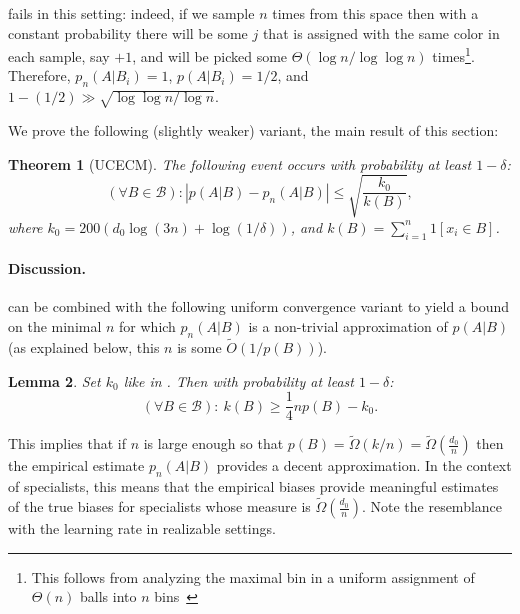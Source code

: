 \documentclass{article}
\def\B{{\mathcal B}}
\newtheorem{theorem}{Theorem}
\newtheorem{lemma}[theorem]{Lemma}
\newcommand{\comment}[3]{}  %
\newcommand{\shay}[1]{\comment{purple}{Shay}{#1}}
\begin{document}
 fails in this setting:
indeed, if we sample $n$ times from this space 
then with a constant probability there will be some  $j$
that is assigned with the same color in each sample,  say $+1$, 
and will be picked some $\Theta(\log n/\log\log n)$ times\footnote{{This follows from analyzing the maximal bin
in a uniform assignment of $\Theta(n)$ balls into $n$ bins~\cite{bins}}}.
Therefore, $p_n(A\vert B_i) = 1$, $p(A\vert B_i)=1/2$,
and $1-(1/2) \gg \sqrt{\log\log n/\log n}$.

We prove the following (slightly weaker) variant, the main result of this section:
\begin{theorem}[UCECM]\label{thm:UCECM}
The following event occurs with probability at least $1-\delta$:
\[\left(\forall B\in\B\right):\left\lvert p(A \vert B) - p_n(A \vert B) \right\rvert \leq 
\sqrt{\frac{k_0}{k(B)}},\]
where $k_0 = 200 \left(d_0 \log(3n) + \log(1/\delta)\right)$, and $k(B) = \sum_{i=1}^n 1[x_i\in B]$.
\end{theorem}

\paragraph{Discussion.}

 can be combined with the following uniform convergence 
variant to yield a bound on the minimal $n$ for which $p_n(A \vert B)$ 
is a non-trivial approximation of $p(A \vert B)$
(as explained below, this $n$ is some $\tilde O\left(1/p(B)\right)$).
\shay{Is the following lemma is essentially equivalent to \Cref{lemma:points-in-balls}?}
\begin{lemma}\label{lem:uconeside}
Set $k_0$ like in . Then with probability at least $1-\delta$:
\[
(\forall B\in \B):~ k(B) \geq \frac{1}{4}np(B) - {k_0}.
\]
\end{lemma}
This implies that if $n$ is large enough so that $p(B)=\tilde\Omega(k/n)=\tilde\Omega\left(\frac{d_0}{n}\right)$
then the empirical estimate $p_n(A\vert B)$ provides a decent approximation.
In the context of specialists, this means that the empirical
biases provide meaningful estimates of the true biases 
for specialists whose measure is $\tilde\Omega\left(\frac{d_0}{n}\right)$.
Note the resemblance with the learning rate in realizable settings.
%
\end{document}
